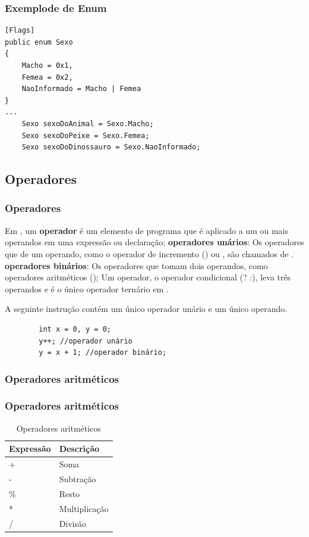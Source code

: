 \documentclass{beamer}
\begin{document}
\begin{frame}[fragile]
\frametitle{Exemplode de Enum}
\begin{lstlisting}
[Flags]
public enum Sexo
{
	Macho = 0x1,
	Femea = 0x2,
	NaoInformado = Macho | Femea
}
...
	Sexo sexoDoAnimal = Sexo.Macho;
	Sexo sexoDoPeixe = Sexo.Femea;
	Sexo sexoDoDinossauro = Sexo.NaoInformado;
\end{lstlisting}
\end{frame}


\subsection{Operadores}

\begin{frame}[fragile]
\frametitle{Operadores}
\begin{outline}
	\1 Em \CS, um \textbf{operador} é um elemento de programa que é aplicado a um ou mais operandos em uma expressão ou declaração;
	\2 \textbf{operadores unários}: Os operadores que de um operando, como o operador de incremento (\codef{++}) ou , são chamados de . 
	\2 \textbf{operadores binários}: Os operadores que tomam dois operandos, como operadores aritméticos (\codef{+, -, *, /}); 
	\2 Um operador, o operador condicional (? :), leva três operandos e é o único operador ternário em \CS.
	
	\1 A seguinte instrução \CS contém um único operador unário e um único operando. 	
	\2 \begin{lstlisting}
		int x = 0, y = 0;
		y++; //operador unário
		y = x + 1; //operador binário;
	\end{lstlisting}
\end{outline}
\end{frame}

\subsubsection{Operadores aritméticos}

\begin{frame}
\frametitle{Operadores aritméticos}
		\begin{table}[]			
			\label{tab:operadoresAritimeticos}
			\begin{tabular}{|l|l|}
				\hline
				Expressão & Descrição 		\\ \hline
				+          & Soma 			\\ \hline
				-          & Subtração 		\\ \hline
				\%         & Resto      	\\ \hline
				*          & Multiplicação 	\\ \hline
				/          & Divisão       	\\ \hline
			\end{tabular}
			\caption{Operadores aritméticos}
		\end{table}

\end{frame}
\end{document}
